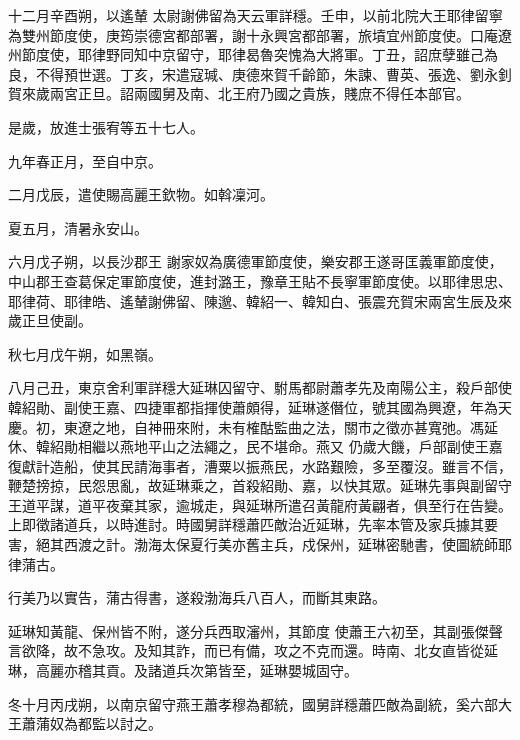\begin{pinyinscope}
 十二月辛酉朔，以遙輦
 太尉謝佛留為天云軍詳穩。壬申，以前北院大王耶律留寧為雙州節度使，庚筠崇德宮都部署，謝十永興宮都部署，旅墳宜州節度使。口庵遼州節度使，耶律野同知中京留守，耶律曷魯突愧為大將軍。丁丑，詔庶孽雖己為良，不得預世選。丁亥，宋遣寇瑊、庚德來賀千齡節，朱諫、曹英、張逸、劉永釗賀來歲兩宮正旦。詔兩國舅及南、北王府乃國之貴族，賤庶不得任本部官。



 是歲，放進士張宥等五十七人。



 九年春正月，至自中京。



 二月戊辰，遣使賜高麗王欽物。如斡凜河。



 夏五月，清暑永安山。



 六月戊子朔，以長沙郡王
 謝家奴為廣德軍節度使，樂安郡王遂哥匡義軍節度使，中山郡王查葛保定軍節度使，進封潞王，豫章王貼不長寧軍節度使。以耶律思忠、耶律荷、耶律皓、遙輦謝佛留、陳邈、韓紹一、韓知白、張震充賀宋兩宮生辰及來歲正旦使副。



 秋七月戊午朔，如黑嶺。



 八月己丑，東京舍利軍詳穩大延琳囚留守、駙馬都尉蕭孝先及南陽公主，殺戶部使韓紹勛、副使王嘉、四捷軍都指揮使蕭頗得，延琳遂僭位，號其國為興遼，年為天慶。初，東遼之地，自神冊來附，未有榷酤監曲之法，關市之徵亦甚寬弛。馮延休、韓紹勛相繼以燕地平山之法繩之，民不堪命。燕又
 仍歲大饑，戶部副使王嘉復獻計造船，使其民請海事者，漕粟以振燕民，水路艱險，多至覆沒。雖言不信，鞭楚搒掠，民怨思亂，故延琳乘之，首殺紹勛、嘉，以快其眾。延琳先事與副留守王道平謀，道平夜棄其家，逾城走，與延琳所遣召黃龍府黃翩者，俱至行在告變。上即徵諸道兵，以時進討。時國舅詳穩蕭匹敵治近延琳，先率本管及家兵據其要害，絕其西渡之計。渤海太保夏行美亦舊主兵，戍保州，延琳密馳書，使圖統師耶律蒲古。



 行美乃以實告，蒲古得書，遂殺渤海兵八百人，而斷其東路。



 延琳知黃龍、保州皆不附，遂分兵西取瀋州，其節度
 使蕭王六初至，其副張傑聲言欲降，故不急攻。及知其詐，而已有備，攻之不克而還。時南、北女直皆從延琳，高麗亦稽其貢。及諸道兵次第皆至，延琳嬰城固守。



 冬十月丙戌朔，以南京留守燕王蕭孝穆為都統，國舅詳穩蕭匹敵為副統，奚六部大王蕭蒲奴為都監以討之。




\end{pinyinscope}
